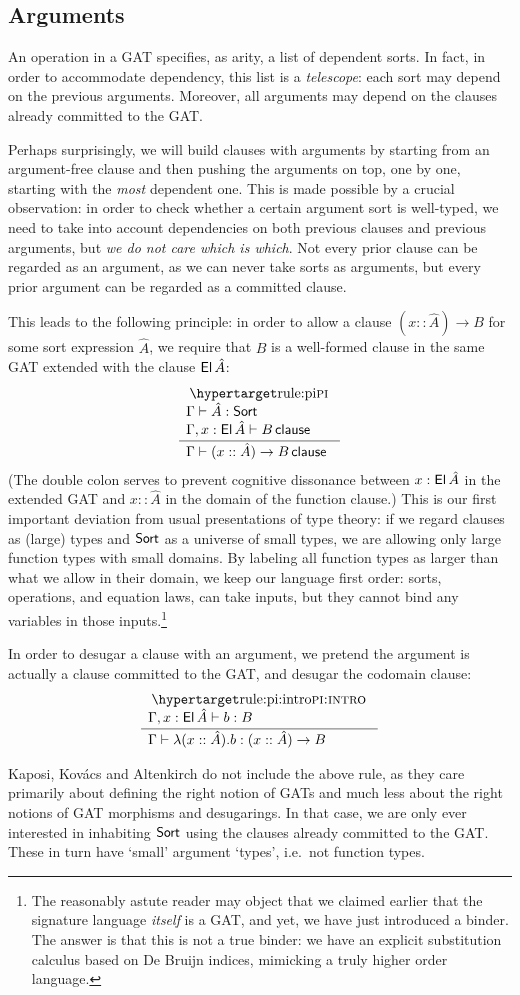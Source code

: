 \documentclass[a4paper]{article}
\begin{document}
\subsection{Arguments}
An operation in a GAT specifies, as arity, a list of dependent sorts.
In fact, in order to accommodate dependency, this list is a \emph{telescope}: each sort may depend on the previous arguments.
Moreover, all arguments may depend on the clauses already committed to the GAT.

Perhaps surprisingly, we will build clauses with arguments by starting from an argument-free clause and then pushing the arguments on top, one by one, starting with the \emph{most} dependent one.
This is made possible by a crucial observation: in order to check whether a certain argument sort is well-typed, we need to take into account dependencies on both previous clauses and previous arguments, but \emph{we do not care which is which}.
Not every prior clause can be regarded as an argument, as we can never take sorts as arguments, but every prior argument can be regarded as a committed clause.

This leads to the following principle: in order to allow a clause $(x :: \hat A) \to B$ for some sort expression $\hat A$, we require that $B$ is a well-formed clause in the same GAT extended with the clause ${\mathsf{El}}\,\hat A$:
\[
	\inferencel{pi}{
		\Gamma \sez \hat A : \Sort \\
		\Gamma, x : \El\,\hat A \sez B \clause	
	}{
		\Gamma \sez (x :: \hat A) \to B \clause
	}{}
\]
(The double colon serves to prevent cognitive dissonance between $x : {\mathsf{El}}\,\hat A$ in the extended GAT and $x :: \hat A$ in the domain of the function clause.)
This is our first important deviation from usual presentations of type theory: if we regard clauses as (large) types and ${\mathsf{Sort}}$ as a universe of small types, we are allowing only large function types with small domains.
By labeling all function types as larger than what we allow in their domain, we keep our language first order: sorts, operations, and equation laws, can take inputs, but they cannot bind any variables in those inputs.\footnote{The reasonably astute reader may object that we claimed earlier that the signature language \emph{itself} is a GAT, and yet, we have just introduced a binder. The answer is that this is not a true binder: we have an explicit substitution calculus based on De Bruijn indices, mimicking a truly higher order language.}

In order to desugar a clause with an argument, we pretend the argument is actually a clause committed to the GAT, and desugar the codomain clause:
\[
	\inferencel{pi:intro}{
		\Gamma, x : \El\,\hat A \sez b : B
	}{
		\Gamma \sez \lambda(x :: \hat A).b : (x :: \hat A) \to B
	}{}
\]
\begin{remark} \label{rem:kka-no-constructors}
Kaposi, Kov\'acs and Altenkirch \cite{constructing-qiits} do not include the above rule,  as they care primarily about defining the right notion of GATs and much less about the right notions of GAT morphisms and desugarings.
In that case, we are only ever interested in inhabiting ${\mathsf{Sort}}$ using the clauses already committed to the GAT. These in turn have `small' argument `types', i.e.\ not function types.
\end{remark}
\end{document}
